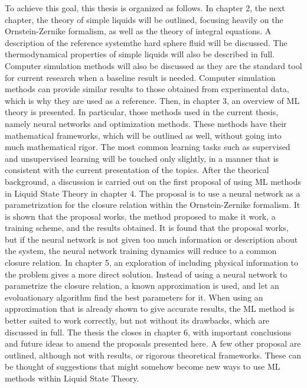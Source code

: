 To achieve this goal, this thesis is organized as follows. In chapter 2, the next chapter,
the theory of simple liquids will be outlined, focusing heavily on the Ornstein-Zernike
formalism, as well as the theory of integral equations.
A description of the reference system\textemdash the hard sphere fluid\textemdash 
will be discussed. The thermodynamical properties of simple liquids will also be described 
in full. Computer simulation methods will also be discussed as they are the standard tool 
for current research when a baseline result is needed. Computer simulation methods can 
provide similar results to those obtained from experimental data, which is why they are 
used as a reference.
Then, in chapter 3, an overview of ML theory is presented.
In particular, those methods used in the current thesis, namely neural networks and
optimization methods. These methods have their mathematical frameworks, which will be
outlined as well, without going into much mathematical rigor.
The most common learning tasks such as supervised and unsupervised learning will be
touched only slightly, in a manner that is consistent with the current presentation
of the topics.
After the theorical background, a discussion is carried out on the first proposal of using 
ML methods in Liquid State Theory in chapter 4.
The proposal is to use a neural network as a 
parametrization for the closure relation within the Ornstein-Zernike formalism.
It is shown that the proposal works, the method proposed to make it work, a training
scheme, and the results obtained. It is found that the proposal works, but if the neural
network is not given too much information or description about the system, the neural
network training dynamics will reduce to a common closure relation.
In chapter 5, an exploration of including physical information to the problem gives
a more direct solution. Instead of using a neural network to parametrize the closure
relation, a known approximation is used, and let an evoluationary algorithm find the
best parameters for it. When using an approximation that is already shown to give
accurate results, the ML method is better suited to work correctly, but not without
its drawbacks, which are discussed in full.
The thesis the closes in chapter 6, with important conclusions and future ideas
to amend the proposals presented here. A few other proposal are outlined, although
not with results, or rigorous theoretical frameworks. These can be thought of
suggestions that might somehow become new ways to use ML methods within Liquid
State Theory.